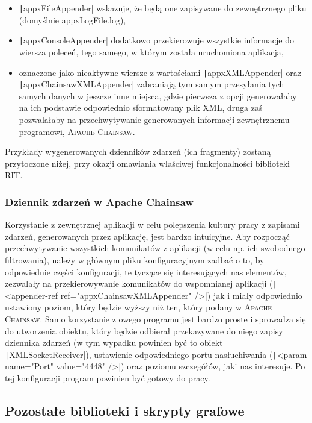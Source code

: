 \begin{itemize}
	\item \texttt|appxFileAppender| wskazuje, że będą one zapisywane do zewnętrznego pliku (domyślnie \textsf{appxLogFile.log}),
	\item \texttt|appxConsoleAppender|  dodatkowo przekierowuje wszystkie informacje do wiersza poleceń, tego samego, w którym została uruchomiona aplikacja,
	\item oznaczone jako nieaktywne wiersze z wartościami \texttt|appxXMLAppender| oraz \texttt|appxChainsawXMLAppender| zabraniają tym samym przesyłania tych samych danych w jeszcze inne miejsca, gdzie pierwsza z opcji generowałaby na ich podstawie odpowiednio sformatowany plik \textsc{XML}, druga zaś pozwalałaby na przechwytywanie generowanych informacji zewnętrznemu programowi, \textsc{Apache Chainsaw}.
\end{itemize}

Przykłady wygenerowanych dzienników zdarzeń (ich fragmenty) zostaną przytoczone niżej, przy okazji omawiania właściwej funkcjonalności biblioteki \textsc{RIT}.

\subsubsection{Dziennik zdarzeń w Apache Chainsaw}

Korzystanie z zewnętrznej aplikacji w celu polepszenia kultury pracy z zapisami zdarzeń, generowanych przez aplikację, jest bardzo intuicyjne. Aby rozpocząć przechwytywanie wszystkich komunikatów z aplikacji (w celu np. ich swobodnego filtrowania), należy w głównym pliku konfiguracyjnym zadbać o to, by odpowiednie części konfiguracji, te tyczące się interesujących nas elementów, zezwalały na przekierowywanie komunikatów do wspomnianej aplikacji (\texttt|<appender-ref ref="appxChainsawXMLAppender" />|) jak i miały odpowiednio ustawiony poziom, który będzie wyższy niż ten, który podany w \textsc{Apache Chainsaw}. Samo korzystanie z owego programu jest bardzo proste i sprowadza się do utworzenia obiektu, który będzie odbierał przekazywane do niego zapisy dziennika zdarzeń (w tym wypadku powinien być to obiekt \texttt|XMLSocketReceiver|), ustawienie odpowiedniego portu nasłuchiwania (\texttt|<param name="Port" value="4448" />|) oraz poziomu szczegółów, jaki nas interesuje. Po tej konfiguracji program powinien być gotowy do pracy.

\subsection{Pozostałe biblioteki i skrypty grafowe}

